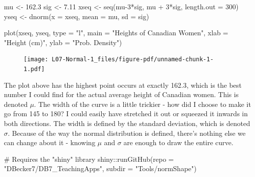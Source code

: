 \documentclass[
  letterpaper,
  DIV=11,
  numbers=noendperiod]{scrreprt}
\newenvironment{Shaded}{\begin{snugshade}}{\end{snugshade}}
\newcommand{\AttributeTok}[1]{\textcolor[rgb]{0.40,0.45,0.13}{#1}}
\newcommand{\CommentTok}[1]{\textcolor[rgb]{0.37,0.37,0.37}{#1}}
\newcommand{\DecValTok}[1]{\textcolor[rgb]{0.68,0.00,0.00}{#1}}
\newcommand{\FloatTok}[1]{\textcolor[rgb]{0.68,0.00,0.00}{#1}}
\newcommand{\FunctionTok}[1]{\textcolor[rgb]{0.28,0.35,0.67}{#1}}
\newcommand{\NormalTok}[1]{\textcolor[rgb]{0.00,0.23,0.31}{#1}}
\newcommand{\OtherTok}[1]{\textcolor[rgb]{0.00,0.23,0.31}{#1}}
\newcommand{\SpecialCharTok}[1]{\textcolor[rgb]{0.37,0.37,0.37}{#1}}
\newcommand{\StringTok}[1]{\textcolor[rgb]{0.13,0.47,0.30}{#1}}
\begin{document}
\begin{Shaded}
\begin{Highlighting}[]
\NormalTok{mu }\OtherTok{\textless{}{-}} \FloatTok{162.3}
\NormalTok{sig }\OtherTok{\textless{}{-}} \FloatTok{7.11}
\NormalTok{xseq }\OtherTok{\textless{}{-}} \FunctionTok{seq}\NormalTok{(mu}\DecValTok{{-}3}\SpecialCharTok{*}\NormalTok{sig, mu }\SpecialCharTok{+} \DecValTok{3}\SpecialCharTok{*}\NormalTok{sig, }\AttributeTok{length.out =} \DecValTok{300}\NormalTok{)}
\NormalTok{yseq }\OtherTok{\textless{}{-}} \FunctionTok{dnorm}\NormalTok{(}\AttributeTok{x =}\NormalTok{ xseq, }\AttributeTok{mean =}\NormalTok{ mu, }\AttributeTok{sd =}\NormalTok{ sig) }

\FunctionTok{plot}\NormalTok{(xseq, yseq, }\AttributeTok{type =} \StringTok{"l"}\NormalTok{,}
  \AttributeTok{main =} \StringTok{"Heights of Canadian Women"}\NormalTok{,}
  \AttributeTok{xlab =} \StringTok{"Height (cm)"}\NormalTok{, }\AttributeTok{ylab =} \StringTok{"Prob. Density"}\NormalTok{)}
\end{Highlighting}
\end{Shaded}

\begin{figure}[H]

{\centering \texttt{[image: L07-Normal-1\_files/figure-pdf/unnamed-chunk-1-1.pdf]}

}

\end{figure}

The plot above has the highest point occurs at exactly 162.3, which is
the best number I could find for the actual average height of Canadian
women. This is denoted \(\mu\). The width of the curve is a little
trickier - how did I choose to make it go from 145 to 180? I could
easily have stretched it out or squeezed it inwards in both directions.
The width is defined by the standard deviation, which is denoted
\(\sigma\). Because of the way the normal distribution is defined,
there's nothing else we can change about it - knowing \(\mu\) and
\(\sigma\) are enough to draw the entire curve.

\begin{Shaded}
\begin{Highlighting}[]
\CommentTok{\# Requires the "shiny" library}
\NormalTok{shiny}\SpecialCharTok{::}\FunctionTok{runGitHub}\NormalTok{(}\AttributeTok{repo =} \StringTok{"DBecker7/DB7\_TeachingApps"}\NormalTok{, }
    \AttributeTok{subdir =} \StringTok{"Tools/normShape"}\NormalTok{)}
\end{Highlighting}
\end{Shaded}
\end{document}
